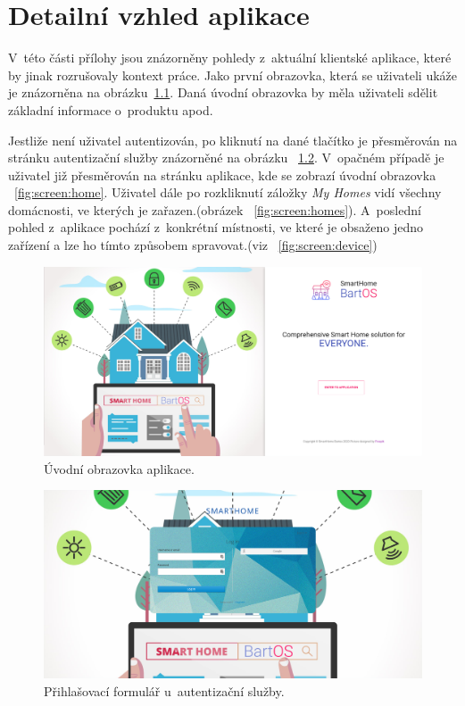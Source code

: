 \chapter{Detailní vzhled aplikace}
V~této části přílohy jsou znázorněny pohledy z~aktuální klientské aplikace, které by jinak rozrušovaly kontext práce.
Jako první obrazovka, která se uživateli ukáže je znázorněna na obrázku~\ref{fig:screen:index}.
Daná úvodní obrazovka by měla uživateli sdělit základní informace o~produktu apod.

Jestliže není uživatel autentizován, po kliknutí na dané tlačítko je přesměrován na stránku autentizační služby znázorněné na obrázku ~\ref{fig:screen:keycloak}.
V~opačném případě je uživatel již přesměrován na stránku aplikace, kde se zobrazí úvodní obrazovka ~\ref{fig:screen:home}.
Uživatel dále po rozkliknutí záložky \emph{My Homes} vidí všechny domácnosti, ve kterých je zařazen.(obrázek ~\ref{fig:screen:homes}).
A~poslední pohled z~aplikace pochází z~konkrétní místnosti, ve které je obsaženo jedno zařízení a lze ho tímto způsobem spravovat.(viz ~\ref{fig:screen:device})

\begin{figure}[hbt]
    \centering
    \includegraphics[width=1\linewidth]{obrazky-figures/screen/login.png}
    \caption{Úvodní obrazovka aplikace.}
    \label{fig:screen:index}
\end{figure}

\begin{figure}[hbt]
    \centering
    \includegraphics[width=1\linewidth]{obrazky-figures/screen/keycloak.png}
    \caption{Přihlašovací formulář u~autentizační služby.}
    \label{fig:screen:keycloak}
\end{figure}

